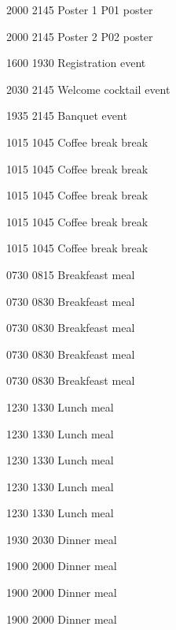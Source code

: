          {2000} {2145} {Poster 1} {} {P01} {poster}
        
         {2000} {2145} {Poster 2} {} {P02} {poster}
        
         {1600} {1930} {Registration} {} {} {event}
        
         {2030} {2145} {Welcome cocktail} {} {} {event}
        
         {1935} {2145} {Banquet} {} {} {event}
        
         {1015} {1045} {\ft Coffee break} {} {} {break}
        
         {1015} {1045} {\ft Coffee break} {} {} {break}
        
         {1015} {1045} {\ft Coffee break} {} {} {break}
        
         {1015} {1045} {\ft Coffee break} {} {} {break}
        
         {1015} {1045} {\ft Coffee break} {} {} {break}
        
         {0730} {0815} {Breakfeast} {} {} {meal}
        
         {0730} {0830} {Breakfeast} {} {} {meal}
        
         {0730} {0830} {Breakfeast} {} {} {meal}
        
         {0730} {0830} {Breakfeast} {} {} {meal}
        
         {0730} {0830} {Breakfeast} {} {} {meal}
        
         {1230} {1330} {Lunch} {} {} {meal}
        
         {1230} {1330} {Lunch} {} {} {meal}
        
         {1230} {1330} {Lunch} {} {} {meal}
        
         {1230} {1330} {Lunch} {} {} {meal}
        
         {1230} {1330} {Lunch} {} {} {meal}
        
         {1930} {2030} {Dinner} {} {} {meal}
        
         {1900} {2000} {Dinner} {} {} {meal}
        
         {1900} {2000} {Dinner} {} {} {meal}
        
         {1900} {2000} {Dinner} {} {} {meal}
        